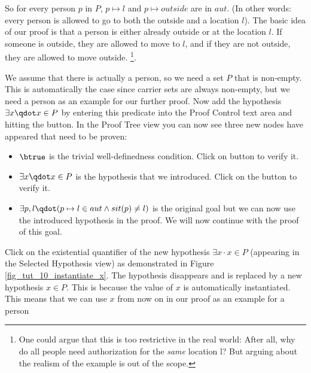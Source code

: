 
So for every person $p$ in $P$, $p \mapsto l$ and $p \mapsto outside$ are in $aut$.
(In other words: every person is allowed to go to both the outside and a location $l$).
The basic idea of our proof is that a person is either already outside or at the location $l$. If someone is outside, they are allowed to move to $l$, and if they are not outside, they are allowed to move outside. \footnote{One could argue that this is too restrictive in the real world: After all, why do all people need authorization for the \textit{same} location l?  But arguing about the realism of the example is out of the scope.}.

We assume that there is actually a person, so we need a set $P$ that is non-empty. 
This is automatically the case since carrier sets are always non-empty, but we need a person as an example for our further proof. 
Now add the hypothesis $\exists x \qdot x \in P$ by entering this predicate into the \textsf{Proof Control} text area and hitting the  button.
In the \textsf{Proof Tree} view you can now see three new nodes have appeared that need to be proven:
\begin{itemize}
\item $\btrue$ is the trivial well-definedness condition. Click on  button to verify it.
\item $\exists x\qdot x\in P$ is the hypothesis that we introduced. Click on the  button to verify it.
\item $\exists p, l\qdot (p \mapsto  l \in  aut \land  sit(p) \neq  l)$ is the original goal
  but we can now use the introduced hypothesis in the proof. We will now continue with the proof of this goal.
\end{itemize}

Click on the existential quantifier of the new hypothesis $\exists x \cdot x \in P$
  (appearing in the \textsf{Selected Hypothesis} view) as demonstrated in Figure \ref{fig_tut_10_instantiate_x}.
The hypothesis disappears and is replaced by a new hypothesis $x \in P$. This is because the value of $x$ is automatically instantiated. This means that we can use $x$ from now on in our proof as an example for a person

